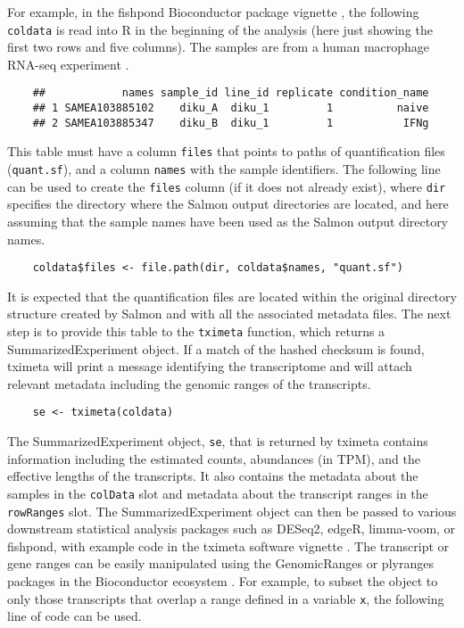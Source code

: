 \documentclass[10pt,letterpaper]{article}
\begin{document}
For example, in the fishpond Bioconductor package vignette \cite{swish}, the
following \texttt{coldata} is read into R in the beginning of the
analysis (here just showing the first two rows and five columns). The
samples are from a human macrophage RNA-seq experiment \cite{alasoo}.

\begin{verbatim}
    ##            names sample_id line_id replicate condition_name
    ## 1 SAMEA103885102    diku_A  diku_1         1          naive
    ## 2 SAMEA103885347    diku_B  diku_1         1           IFNg
\end{verbatim}

This table must have a column \texttt{files} that points to paths of
quantification files (\texttt{quant.sf}), and a column \texttt{names} with the sample
identifiers. The following line can be used to create the
\texttt{files} column (if it does not already exist), where \texttt{dir}
specifies the directory where the Salmon output directories are
located, and here assuming that the sample names have been used as the
Salmon output directory names. 

\begin{verbatim}
    coldata$files <- file.path(dir, coldata$names, "quant.sf")
\end{verbatim}

It is expected that the quantification files are located
within the original directory structure created by Salmon and with all
the associated metadata files. The next
step is to provide this table to the \texttt{tximeta} function, which
returns a SummarizedExperiment object. If a match of the hashed
checksum is found, tximeta will print a message identifying the
transcriptome and will attach relevant metadata including the genomic
ranges of the transcripts.

\begin{verbatim}
    se <- tximeta(coldata)
\end{verbatim}

The SummarizedExperiment object, \texttt{se}, that is returned by
tximeta contains information including the estimated counts,
abundances (in TPM), and the effective lengths of the transcripts.
It also contains the metadata about the samples in the
\texttt{colData} slot and metadata about the transcript ranges in the
\texttt{rowRanges} slot.
The SummarizedExperiment object can then be passed to various
downstream statistical analysis packages such as DESeq2, edgeR,
limma-voom, or fishpond, with example code in the tximeta software
vignette \cite{deseq2,edger,limma,voom,swish}. The
transcript or gene ranges can be easily manipulated using the
GenomicRanges or plyranges packages in the Bioconductor ecosystem
\cite{granges,Lee2019}. For example, to subset the object to only
those transcripts that overlap a range defined in a variable
\texttt{x}, the following line of code can be used.
\end{document}
